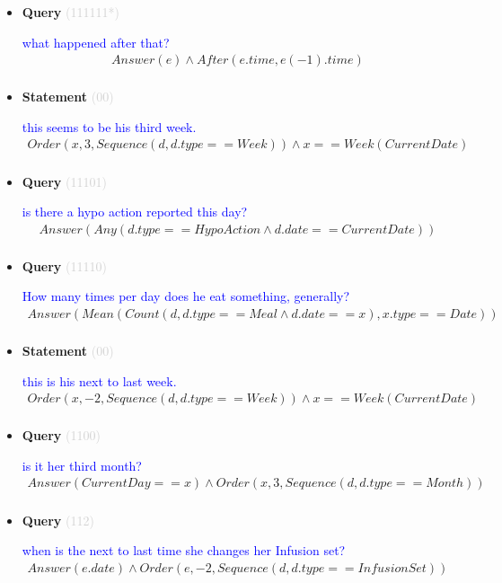 \documentclass[11pt]{article}
\newcommand{\key}[1]{\textcolor{lightgray}{#1}}
\newcounter{CQuery}
\newcounter{CStatement}
\begin{document}
\begin{itemize}
\item
\textbf{Query\theCQuery} \key{(111111*)} \addtocounter{CQuery}{1}
\textcolor{blue}{ what happened after that? }
\begin{multline*}
Answer(e) \wedge After(e.time, e(-1).time) \\ 
\end{multline*}


\item
\textbf{Statement\theCStatement} \key{(00)} \addtocounter{CStatement}{1}
\textcolor{blue}{ this seems to be his third week. }
\begin{multline*}
Order(x, 3, Sequence(d, d.type==Week)) \wedge x==Week(CurrentDate) \\ 
\end{multline*}


\item
\textbf{Query\theCQuery} \key{(11101)} \addtocounter{CQuery}{1}
\textcolor{blue}{ is there a hypo action reported this day? }
\begin{multline*}
Answer(Any(d.type==HypoAction \wedge d.date==CurrentDate)) \\ 
\end{multline*}


\item
\textbf{Query\theCQuery} \key{(11110)} \addtocounter{CQuery}{1}
\textcolor{blue}{ How many times per day does he eat something, generally? }
\begin{multline*}
Answer(Mean(Count(d, d.type==Meal \wedge d.date==x), x.type==Date)) \\ 
\end{multline*}


\item
\textbf{Statement\theCStatement} \key{(00)} \addtocounter{CStatement}{1}
\textcolor{blue}{ this is his next to last week. }
\begin{multline*}
Order(x, -2, Sequence(d, d.type==Week)) \wedge x==Week(CurrentDate) \\ 
\end{multline*}


\item
\textbf{Query\theCQuery} \key{(1100)} \addtocounter{CQuery}{1}
\textcolor{blue}{ is it her third month? }
\begin{multline*}
Answer(CurrentDay==x) \wedge Order(x, 3, Sequence(d, d.type==Month)) \\ 
\end{multline*}


\item
\textbf{Query\theCQuery} \key{(112)} \addtocounter{CQuery}{1}
\textcolor{blue}{ when is the next to last time she changes her Infusion set? }
\begin{multline*}
Answer(e.date) \wedge Order(e, -2, Sequence(d, d.type==InfusionSet)) \\ 
\end{multline*}



\end{itemize}
\end{document}
